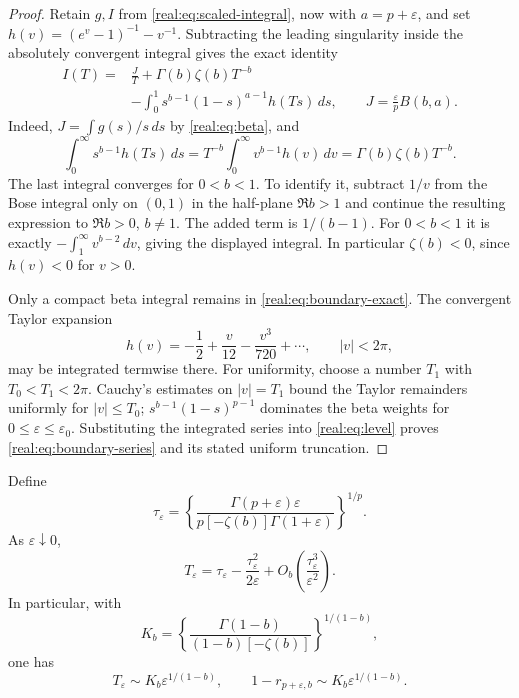 \begin{proof}
Retain $g,I$ from \eqref{real:eq:scaled-integral}, now with
$a=p+\varepsilon$, and set
$h(v)=(e^v-1)^{-1}-v^{-1}$. Subtracting the leading singularity
inside the absolutely convergent integral gives the exact identity
\begin{equation}\label{real:eq:boundary-exact}
\begin{split}
 I(T)={}&\frac{J}{T}+\Gamma(b)\zeta(b)T^{-b}\\
 &-\int_0^1 s^{b-1}(1-s)^{a-1}h(Ts)\,ds,\qquad
 J=\frac{\varepsilon}{p}B(b,a).
\end{split}
\end{equation}
Indeed, $J=\int g(s)/s\,ds$ by \eqref{real:eq:beta}, and
\[
 \int_0^\infty s^{b-1}h(Ts)\,ds
 =T^{-b}\int_0^\infty v^{b-1}h(v)\,dv
 =\Gamma(b)\zeta(b)T^{-b}.
\]
The last integral converges for $0<b<1$. To identify it, subtract
$1/v$ from the Bose integral only on $(0,1)$ in the half-plane
$\Re b>1$ and continue the resulting expression to $\Re b>0$,
$b\ne1$. The added term is $1/(b-1)$. For $0<b<1$ it is exactly
$-\int_1^\infty v^{b-2}\,dv$, giving the displayed integral.
In particular $\zeta(b)<0$, since $h(v)<0$ for $v>0$.

Only a compact beta integral remains in
\eqref{real:eq:boundary-exact}. The convergent Taylor expansion
\[
 h(v)=-\frac12+\frac v{12}-\frac{v^3}{720}+\cdots,\qquad |v|<2\pi,
\]
may be integrated termwise there. For uniformity, choose a number
$T_1$ with $T_0<T_1<2\pi$. Cauchy's estimates on $|v|=T_1$
bound the Taylor remainders uniformly for $|v|\leq T_0$;
$s^{b-1}(1-s)^{p-1}$ dominates the beta weights for
$0\leq\varepsilon\leq\varepsilon_0$. Substituting the integrated
series into \eqref{real:eq:level} proves
\eqref{real:eq:boundary-series} and its stated uniform truncation.
\end{proof}

\begin{theorem}
\label{real:thm:boundary-crossing}
Define
\begin{equation}\label{real:eq:tau}
 \tau_\varepsilon=
 \left\{\frac{\Gamma(p+\varepsilon)\varepsilon}
 {p[-\zeta(b)]\Gamma(1+\varepsilon)}\right\}^{1/p}.
\end{equation}
As $\varepsilon\downarrow0$,
\begin{equation}\label{real:eq:crossing-correction}
 T_\varepsilon
 =\tau_\varepsilon-\frac{\tau_\varepsilon^2}{2\varepsilon}
   +O_b\!\left(\frac{\tau_\varepsilon^3}{\varepsilon^2}\right).
\end{equation}
In particular, with
\begin{equation}\label{real:eq:boundary-constant}
 K_b=\left\{\frac{\Gamma(1-b)}{(1-b)[-\zeta(b)]}\right\}^{1/(1-b)},
\end{equation}
one has
\begin{equation}\label{real:eq:crossing-leading}
 T_\varepsilon\sim K_b\varepsilon^{1/(1-b)},\qquad
 1-r_{p+\varepsilon,b}\sim K_b\varepsilon^{1/(1-b)}.
\end{equation}
\end{theorem}

